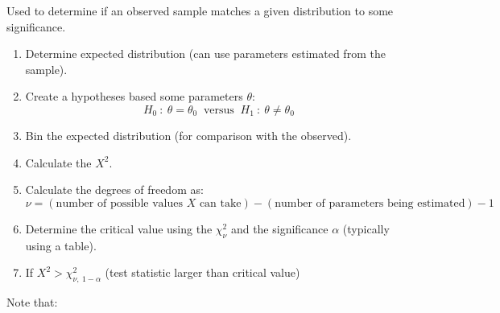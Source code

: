 \documentclass{report}
\begin{document}
            Used to determine if an observed sample matches a given distribution to some significance.
            \begin{enumerate}
                \item Determine expected distribution (can use parameters estimated from the sample).
                \item Create a hypotheses based some parameters $\theta$: {
                    \[H_0 \ : \ \theta = \theta_0 \ \text{  versus  } \ H_1 \ : \ \theta \neq \theta_0\]
                }
                \item Bin the expected distribution (for comparison with the observed).
                \item Calculate the  $X^2$.
                \item Calculate the degrees of freedom as: {
                    \[\nu = (\text{number of possible values $X$ can take}) - (\text{number of parameters being estimated}) - 1\]}
                \item Determine the critical value using the  $\chi^2_\nu$ and the significance $\alpha$ (typically using a table).
                \item If $X^2 > \chi^2_{\nu, \ 1 - \alpha}$ (test statistic larger than critical value)
            \end{enumerate}
            Note that:
        
\end{document}
